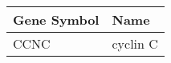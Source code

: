 \begin{tabular}{ll}
\toprule
Gene Symbol &     Name \\
\midrule
       CCNC & cyclin C \\
\bottomrule
\end{tabular}
